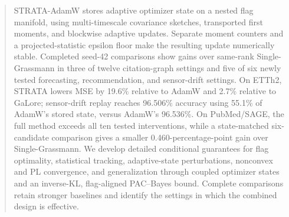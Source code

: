 \documentclass{article}
\begin{document}
\printAffiliationsAndNotice{}
\begin{abstract}
STRATA-AdamW stores adaptive optimizer state on a nested flag manifold, using multi-timescale covariance sketches, transported first moments, and blockwise adaptive updates. Separate moment counters and a projected-statistic epsilon floor make the resulting update numerically stable. Completed seed-42 comparisons show gains over same-rank Single-Grassmann in three of twelve citation-graph settings and five of six newly tested forecasting, recommendation, and sensor-drift settings. On ETTh2, STRATA lowers MSE by 19.6\% relative to AdamW and 2.7\% relative to GaLore; sensor-drift replay reaches 96.506\% accuracy using 55.1\% of AdamW's stored state, versus AdamW's 96.536\%. On PubMed/SAGE, the full method exceeds all ten tested interventions, while a state-matched six-candidate comparison gives a smaller 0.460-percentage-point gain over Single-Grassmann. We develop detailed conditional guarantees for flag optimality, statistical tracking, adaptive-state perturbations, nonconvex and PL convergence, and generalization through coupled optimizer states and an inverse-KL, flag-aligned PAC--Bayes bound. Complete comparisons retain stronger baselines and identify the settings in which the combined design is effective.
\end{abstract}









\clearpage
\appendix
\onecolumn

\end{document}
